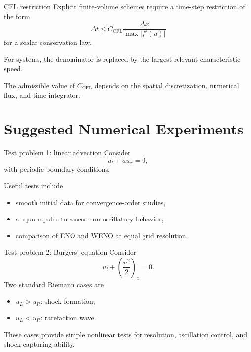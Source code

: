 \documentclass[aspectratio=169]{beamer}
\newcommand{\dx}{\Delta x}
\newcommand{\dt}{\Delta t}
\begin{document}
\begin{frame}{CFL restriction}
Explicit finite-volume schemes require a time-step restriction of the form
\begin{equation}
    \dt
    \le
    C_{\mathrm{CFL}}
    \frac{\dx}{\max |f'(u)|}
\end{equation}
for a scalar conservation law.

\medskip
For systems, the denominator is replaced by the largest relevant characteristic speed.

\medskip
The admissible value of $C_{\mathrm{CFL}}$ depends on the spatial discretization, numerical flux, and time integrator.
\end{frame}

\section{Suggested Numerical Experiments}

\begin{frame}{Test problem 1: linear advection}
Consider
\begin{equation}
    u_t+a u_x=0,
\end{equation}
with periodic boundary conditions.

Useful tests include
\begin{itemize}
    \item smooth initial data for convergence-order studies,
    \item a square pulse to assess non-oscillatory behavior,
    \item comparison of ENO and WENO at equal grid resolution.
\end{itemize}
\end{frame}

\begin{frame}{Test problem 2: Burgers' equation}
Consider
\begin{equation}
    u_t+\left(\frac{u^2}{2}\right)_x=0.
\end{equation}
Two standard Riemann cases are
\begin{itemize}
    \item $u_L>u_R$: shock formation,
    \item $u_L<u_R$: rarefaction wave.
\end{itemize}

These cases provide simple nonlinear tests for resolution, oscillation control, and shock-capturing ability.
\end{frame}
\end{document}
